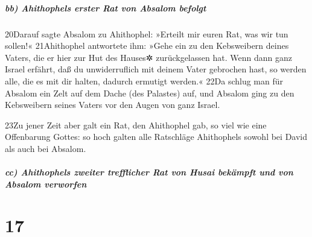 \hypertarget{bb-ahithophels-erster-rat-von-absalom-befolgt}{%
\subparagraph{bb) Ahithophels erster Rat von Absalom
befolgt}\label{bb-ahithophels-erster-rat-von-absalom-befolgt}}

20Darauf sagte Absalom zu Ahithophel: »Erteilt mir euren Rat, was wir
tun sollen!« 21Ahithophel antwortete ihm: »Gehe ein zu den Kebsweibern
deines Vaters, die er hier zur Hut des Hauses✲ zurückgelassen hat. Wenn
dann ganz Israel erfährt, daß du unwiderruflich mit deinem Vater
gebrochen hast, so werden alle, die es mit dir halten, dadurch ermutigt
werden.« 22Da schlug man für Absalom ein Zelt auf dem Dache (des
Palastes) auf, und Absalom ging zu den Kebsweibern seines Vaters vor den
Augen von ganz Israel.

23Zu jener Zeit aber galt ein Rat, den Ahithophel gab, so viel wie eine
Offenbarung Gottes: so hoch galten alle Ratschläge Ahithophels sowohl
bei David als auch bei Absalom.

\hypertarget{cc-ahithophels-zweiter-trefflicher-rat-von-husai-bekuxe4mpft-und-von-absalom-verworfen}{%
\subparagraph{cc) Ahithophels zweiter trefflicher Rat von Husai bekämpft
und von Absalom
verworfen}\label{cc-ahithophels-zweiter-trefflicher-rat-von-husai-bekuxe4mpft-und-von-absalom-verworfen}}

\hypertarget{section-16}{%
\section{17}\label{section-16}}

